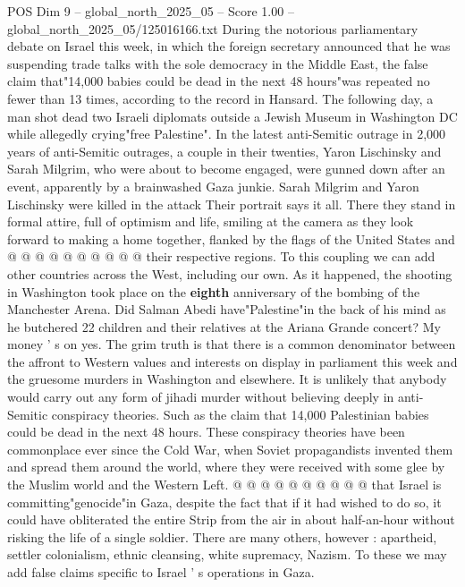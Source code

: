 \begin{textsample}{POS Dim 9 – global\_north\_2025\_05 – Score 1.00 – global\_north\_2025\_05/125016166.txt}  \label{ex:f9_pos_363}
During the notorious parliamentary debate on Israel this week, in which the foreign secretary announced that he was suspending trade talks with the sole democracy in the Middle East, the false claim that"14,000 babies could be dead in the next 48 hours"was repeated no fewer than 13 times, according to the record in Hansard.
The following day, a man shot dead two Israeli diplomats outside a Jewish Museum in Washington DC while allegedly crying"free Palestine".
In the latest anti-Semitic outrage in 2,000 years of anti-Semitic outrages, a couple in their twenties, Yaron Lischinsky and Sarah Milgrim, who were about to become engaged, were gunned down after an event, apparently by a brainwashed Gaza junkie.
Sarah Milgrim and Yaron Lischinsky were killed in the attack Their portrait says it all.
There they stand in formal attire, full of optimism and life, smiling at the camera as they look forward to making a home together, flanked by the flags of the United States and @ @ @ @ @ @ @ @ @ @ their respective regions.
To this coupling we can add other countries across the West, including our own.
As it happened, the shooting in Washington took place on the \textbf{eighth} anniversary of the bombing of the Manchester Arena.
Did Salman Abedi have"Palestine"in the back of his mind as he butchered 22 children and their relatives at the Ariana Grande concert?
My money ' s on yes.
The grim truth is that there is a common denominator between the affront to Western values and interests on display in parliament this week and the gruesome murders in Washington and elsewhere.
It is unlikely that anybody would carry out any form of jihadi murder without believing deeply in anti-Semitic conspiracy theories.
Such as the claim that 14,000 Palestinian babies could be dead in the next 48 hours.
These conspiracy theories have been commonplace ever since the Cold War, when Soviet propagandists invented them and spread them around the world, where they were received with some glee by the Muslim world and the Western Left. @ @ @ @ @ @ @ @ @ @ that Israel is committing"genocide"in Gaza, despite the fact that if it had wished to do so, it could have obliterated the entire Strip from the air in about half-an-hour without risking the life of a single soldier.
There are many others, however : apartheid, settler colonialism, ethnic cleansing, white supremacy, Nazism.
To these we may add false claims specific to Israel ' s operations in Gaza.

\end{textsample}
